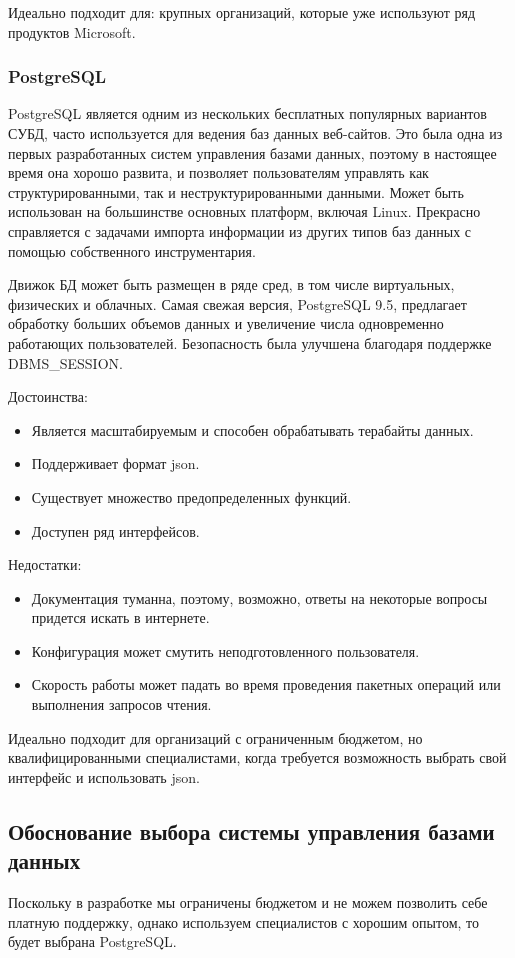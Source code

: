 Идеально подходит для: крупных организаций, которые уже используют ряд продуктов Microsoft.

\subsubsection{PostgreSQL}

PostgreSQL является одним из нескольких бесплатных популярных вариантов СУБД, часто используется для ведения баз данных веб-сайтов. Это была одна из первых разработанных систем управления базами данных, поэтому в настоящее время она хорошо развита, и позволяет пользователям управлять как структурированными, так и неструктурированными данными. Может быть использован на большинстве основных платформ, включая Linux. Прекрасно справляется с задачами импорта информации из других типов баз данных с помощью собственного инструментария.

Движок БД может быть размещен в ряде сред, в том числе виртуальных, физических и облачных. Самая свежая версия, PostgreSQL 9.5, предлагает обработку больших объемов данных и увеличение числа одновременно работающих пользователей. Безопасность была улучшена благодаря поддержке DBMS\_SESSION.

Достоинства:
\begin{itemize}
	\item Является масштабируемым и способен обрабатывать терабайты данных.
	\item Поддерживает формат json.
	\item Существует множество предопределенных функций.
	\item Доступен ряд интерфейсов.
\end{itemize}

Недостатки:

\begin{itemize}
	\item Документация туманна, поэтому, возможно, ответы на некоторые вопросы придется искать в интернете.
	\item Конфигурация может смутить неподготовленного пользователя.
	\item Скорость работы может падать во время проведения пакетных операций или выполнения запросов чтения.
\end{itemize}

Идеально подходит для организаций с ограниченным бюджетом, но квалифицированными специалистами, когда требуется возможность выбрать свой интерфейс и использовать json.

\subsection{Обоснование выбора системы управления базами данных}

Поскольку в разработке мы ограничены бюджетом и не можем позволить себе платную поддержку, однако используем специалистов с хорошим опытом, то будет выбрана PostgreSQL.